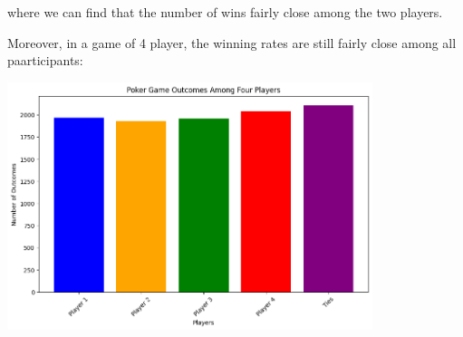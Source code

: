 \documentclass{article}
\begin{document}
where we can find that the number of wins fairly close among the 
two players.

Moreover, in a game of 4 player, the winning rates are still fairly close 
among all paarticipants:

\begin{center}
    \includegraphics[width = 0.8\textwidth]{images/win_rate_4_player.png}
\end{center}
\end{document}
